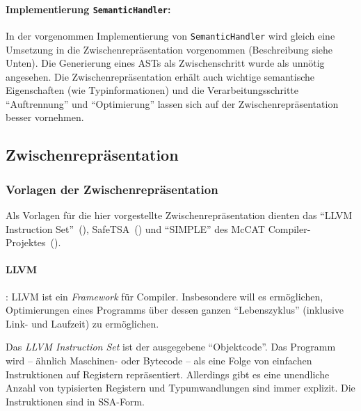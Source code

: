 \documentclass[twoside,a4paper,fleqn,12pt]{article}
\begin{document}
\paragraph{Implementierung \texttt{SemanticHandler}:}
In der vorgenommen Implementierung von \verb+SemanticHandler+ wird gleich eine Umsetzung in die Zwischenrepräsentation vorgenommen
(Beschreibung siehe Unten). Die Generierung eines ASTs als Zwischenschritt wurde als unnötig angesehen.
Die Zwischenrepräsentation erhält auch wichtige semantische Eigenschaften (wie Typinformationen) und
die Verarbeitungsschritte "`Auftrennung"' und "`Optimierung"' lassen sich auf der Zwischenrepräsentation besser vornehmen.


\subsection{Zwischenrepräsentation}




\subsubsection{Vorlagen der Zwischenrepräsentation}

Als Vorlagen für die hier vorgestellte Zwischenrepräsentation dienten das ``LLVM Instruction Set''~(\cite{LLVM:CGO04}),
SafeTSA~(\cite{SafeTSA}) und ``SIMPLE'' des McCAT Compiler-Projektes~(\cite{SIMPLE}).


\paragraph{LLVM}: LLVM ist ein \emph{Framework} für Compiler. Insbesondere will es ermöglichen, Optimierungen
eines Programms über dessen ganzen "`Lebenszyklus"' (inklusive Link- und Laufzeit) zu ermöglichen.

Das \emph{LLVM Instruction Set} ist der ausgegebene "`Objektcode"'. Das Programm wird -- ähnlich Maschinen-
oder Bytecode -- als eine Folge von einfachen Instruktionen auf Registern repräsentiert. 
Allerdings gibt es eine unendliche Anzahl von typisierten Registern und Typumwandlungen sind immer explizit.
Die Instruktionen sind in SSA-Form.
\end{document}
